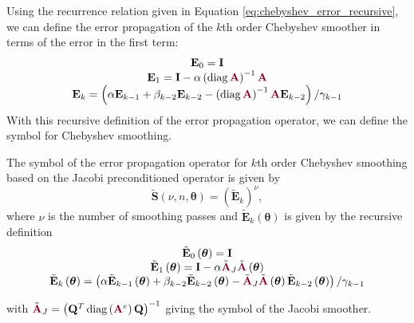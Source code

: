 Using the recurrence relation given in Equation \ref{eq:chebyshev_error_recursive}, we can define the error propagation of the $k$th order Chebyshev smoother in terms of the error in the first term:
\begin{equation}
\begin{tabular}{c}
$\mathbf{E}_0 = \mathbf{I}$\\
$\mathbf{E}_1 = \mathbf{I} - \alpha \left( \diag {\color{burgundy}\mathbf{A}} \right)^{-1} {\color{burgundy}\mathbf{A}}$\\
$\mathbf{E}_k = \left( \alpha \mathbf{E}_{k - 1} + \beta_{k - 2} \mathbf{E}_{k - 2} - \left( \diag {\color{burgundy}\mathbf{A}} \right)^{-1} {\color{burgundy}\mathbf{A}} \mathbf{E}_{k - 2} \right) / \gamma_{k - 1}$
\end{tabular}
\label{eq:chebyshev_error_propagation}
\end{equation}
With this recursive definition of the error propagation operator, we can define the symbol for Chebyshev smoothing.

\begin{definition}
The symbol of the error propagation operator for $k$th order Chebyshev smoothing based on the Jacobi preconditioned operator is given by
\begin{equation}
\tilde{\mathbf{S}} \left( \nu, n, \boldsymbol{\theta} \right) = \left( \tilde{\mathbf{E}}_k \right)^\nu,
\end{equation}
where $\nu$ is the number of smoothing passes and $\tilde{\mathbf{E}}_k \left( \boldsymbol{\theta} \right)$ is given by the recursive definition
\begin{equation}
\begin{tabular}{c}
$\tilde{\mathbf{E}}_0 \left( \boldsymbol{\theta} \right) = \mathbf{I}$\\
$\tilde{\mathbf{E}}_1 \left( \boldsymbol{\theta} \right) = \mathbf{I} - \alpha \tilde{\color{burgundy}\mathbf{A}}_J \tilde{\color{burgundy}\mathbf{A}} \left( \boldsymbol{\theta} \right)$\\
$\tilde{\mathbf{E}}_k \left( \boldsymbol{\theta} \right) = \left( \alpha \tilde{\mathbf{E}}_{k - 1} \left( \boldsymbol{\theta} \right) + \beta_{k - 2} \tilde{\mathbf{E}}_{k - 2} \left( \boldsymbol{\theta} \right) - \tilde{\color{burgundy}\mathbf{A}}_J \tilde{\color{burgundy}\mathbf{A}} \left( \boldsymbol{\theta} \right) \tilde{\mathbf{E}}_{k - 2} \left( \boldsymbol{\theta} \right) \right) / \gamma_{k - 1}$
\end{tabular}
\end{equation}
\label{def:chebyshev_symbol}
\end{definition}
with $\tilde{\color{burgundy}\mathbf{A}}_J = \left( \mathbf{Q}^T \diag \left( {\color{burgundy}\mathbf{A}}^e \right) \mathbf{Q} \right)^{-1}$ giving the symbol of the Jacobi smoother.

